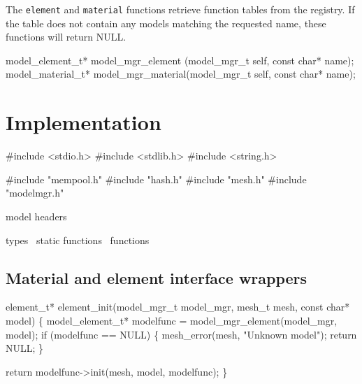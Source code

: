 \nwendcode{}\nwdocspar

The {\tt{}element} and {\tt{}material} functions retrieve function
tables from the registry.  If the table does not contain any models
matching the requested name, these functions will return NULL.

\nwenddocs{}\plusendmoddef
model_element_t*  model_mgr_element (model_mgr_t self, const char* name);
model_material_t* model_mgr_material(model_mgr_t self, const char* name);
\nwendcode{}\nwdocspar


\section{Implementation}

\nwenddocs{}\endmoddef
#include <stdio.h>
#include <stdlib.h>
#include <string.h>

#include "mempool.h"
#include "hash.h"
#include "mesh.h"
#include "modelmgr.h"

\LA{}model headers~{\nwtagstyle{}}\RA{}

\LA{}types~{\nwtagstyle{}}\RA{}
\LA{}static functions~{\nwtagstyle{}}\RA{}
\LA{}functions~{\nwtagstyle{}}\RA{}
\nwendcode{}\nwdocspar

\subsection{Material and element interface wrappers}

\nwenddocs{}\endmoddef
element_t* element_init(model_mgr_t model_mgr,
                        mesh_t mesh, const char* model)
\{
    model_element_t* modelfunc = model_mgr_element(model_mgr, model);
    if (modelfunc == NULL) \{
        mesh_error(mesh, "Unknown model");
        return NULL;
    \}

    return modelfunc->init(mesh, model, modelfunc);
\}

